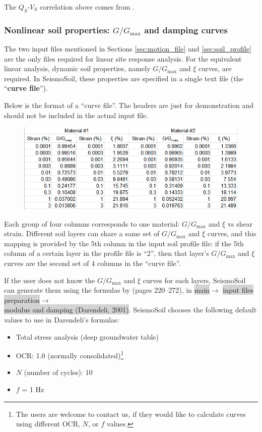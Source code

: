 \documentclass[11pt,letterpaper]{article}
\newcommand{\panel}[1]{\colorbox{lightgray}{\textsf{#1}}}
\begin{document}
The $Q_S$-$V_S$ correlation above comes from \cite{Archuleta_Liu_2004}.

\subsubsection{Nonlinear soil properties: $G/G_{\max}$ and damping curves}\label{sec:curve}

The two input files mentioned in Sections \ref{sec:motion_file} and \ref{sec:soil_profile} are the only files required for linear site response analysis. For the equivalent linear analysis, dynamic soil properties, namely $G/G_{\max}$ and $\xi$ curves, are required. In SeismoSoil, these properties are specified in a single text file (the ``\textbf{curve file}'').

Below is the format of a ``curve file''. The headers are just for demonstration and should not be included in the actual input file. 

\begin{figure}[H]
\centering
  \includegraphics[width=.81\textwidth]{curve_file_format.png}\\
\end{figure}

Each group of four columns corresponds to one material: $G/G_{\max}$ and $\xi$ vs shear strain. Different soil layers can share a same set of $G/G_{\max}$ and $\xi$ curves, and this mapping is provided by the 5th column in the input soil profile file: if the 5th column of a certain layer in the profile file is ``2'', then that layer's $G/G_{\max}$ and $\xi$ curves are the second set of 4 columns in the ``curve file''.

If the user does not know the $G/G_{\max}$ and $\xi$ curves for each layers, SeismoSoil can generate them using the formulas by \cite{Darendeli_2001} (pages 220--272), in \panel{main}$\rightarrow$ \panel{input files preparation}$\rightarrow$\\ \panel{modulus and damping (Darendeli, 2001)}. SeismoSoil chooses the following default values to use in Darendeli's formulas:
\begin{itemize}
\item Total stress analysis (deep groundwater table)
\item OCR: 1.0 (normally consolidated)\footnote{The users are welcome to contact us, if they would like to calculate curves using different OCR, $N$, or $f$ values.}
\item $N$ (number of cycles): 10
\item $f$ = 1 Hz
\end{itemize}
\end{document}
